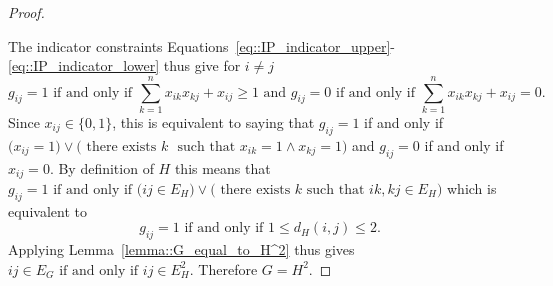 \begin{proof}
\begin{enumerate}[label=\roman*)]
  \end{enumerate} 
  The indicator constraints Equations~\eqref{eq::IP_indicator_upper}-\eqref{eq::IP_indicator_lower} thus give for $i \neq j$
  \[
  g_{ij} = 1 \text{ if and only if } \sum_{k=1}^{n} x_{ik}x_{kj} + x_{ij} \geq 1  \text{ and }  g_{ij} = 0 \text{ if and only if } \sum_{k=1}^{n} x_{ik}x_{kj} + x_{ij} = 0. 
  \]
  Since $x_{ij} \in \{0,1\}$, this is equivalent to saying that $
  g_{ij} = 1$ if and only if $\Big(x_{ij} = 1 \Big) \lor \Big(\text{ there exists } k $ \newline
  $\text{ such that } x_{ik}= 1 \land x_{kj}=1\Big)$ and  $g_{ij} = 0$ if and only if $x_{ij} = 0$. 
  By definition of $H$ this means that $g_{ij} = 1 \text{ if and only if } \Big( ij \in E_H \Big) \lor \Big( \text{ there exists } k \text{ such that } ik,kj \in E_H\Big)$ which is equivalent to 
  \[
  g_{ij} = 1 \text{ if and only if } 1 \leq d_H(i,j) \leq 2. 
  \]
  Applying Lemma~\ref{lemma::G_equal_to_H^2} thus gives $ij \in E_G \text{ if and only if } ij \in E_H^2$. Therefore $G=H^2$. 
\end{proof}

